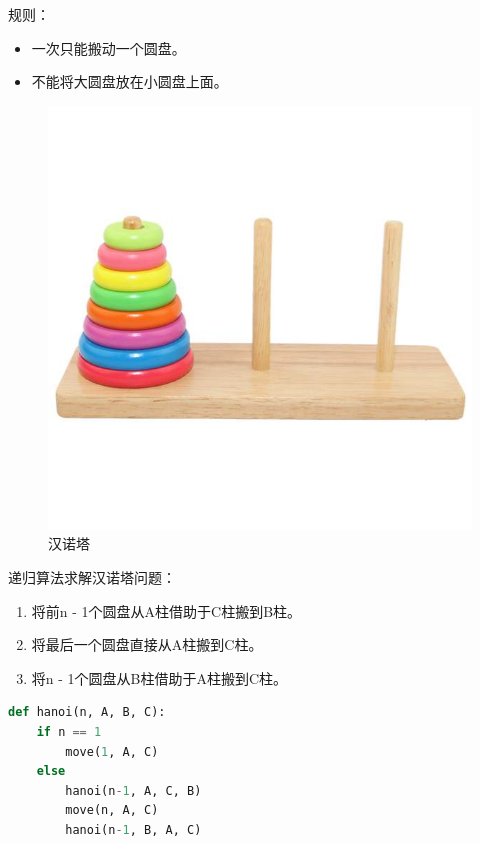 规则：

\begin{itemize}
	\item 一次只能搬动一个圆盘。
	\item 不能将大圆盘放在小圆盘上面。
\end{itemize}

\begin{figure}[H]
	\centering
	\includegraphics[scale=0.4]{img/C11/11-3/1.png}
	\caption{汉诺塔}
\end{figure}

递归算法求解汉诺塔问题：

\begin{enumerate}
	\item 将前n - 1个圆盘从A柱借助于C柱搬到B柱。
	\item 将最后一个圆盘直接从A柱搬到C柱。
	\item 将n - 1个圆盘从B柱借助于A柱搬到C柱。
\end{enumerate}

\vspace{0.5cm}


\begin{lstlisting}[language=Python]
def hanoi(n, A, B, C):
    if n == 1
        move(1, A, C)
    else
        hanoi(n-1, A, C, B)
        move(n, A, C)
        hanoi(n-1, B, A, C)
\end{lstlisting}

